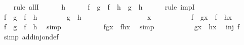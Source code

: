 \begin{isabellebody}
\ \ \isamarkupfalse%
\ {\isacharparenleft}rule\ allI{\isacharparenright}\isanewline
\ \ \ \ \isamarkupfalse%
\ h\isanewline
\ \ \ \ \isamarkupfalse%
\ {\isachardoublequoteopen}f\ {\isasymcirc}\ g\ {\isacharequal}\ f\ {\isasymcirc}\ h\ {\isasymlongrightarrow}\ {\isacharparenleft}g\ {\isacharequal}\ h{\isacharparenright}{\isachardoublequoteclose}\isanewline
\ \ \ \ \isamarkupfalse%
\ {\isacharparenleft}rule\ impI{\isacharparenright}\isanewline
\ \ \ \ \ \ \isamarkupfalse%
\ {\isachardoublequoteopen}f\ {\isasymcirc}\ g\ {\isacharequal}\ f\ {\isasymcirc}\ h{\isachardoublequoteclose}\isanewline
\ \ \ \ \ \ \isamarkupfalse%
\ {\isachardoublequoteopen}g\ {\isacharequal}\ h{\isachardoublequoteclose}\isanewline
\ \ \ \ \ \ \isamarkupfalse%
\ \isanewline
\ \ \ \ \ \ \ \ \isamarkupfalse%
\ x\isanewline
\ \ \ \ \ \ \ \ \isamarkupfalse%
\ \ {\isachardoublequoteopen}{\isacharparenleft}f\ {\isasymcirc}\ g{\isacharparenright}{\isacharparenleft}x{\isacharparenright}\ {\isacharequal}\ {\isacharparenleft}f\ {\isasymcirc}\ h{\isacharparenright}{\isacharparenleft}x{\isacharparenright}{\isachardoublequoteclose}\ \isamarkupfalse%
\ {\isacharbackquoteopen}f\ {\isasymcirc}\ g\ {\isacharequal}\ f\ {\isasymcirc}\ h{\isacharbackquoteclose}\ \isamarkupfalse%
\ simp\isanewline
\ \ \ \ \ \ \ \ \isamarkupfalse%
\ \isamarkupfalse%
\ {\isachardoublequoteopen}f{\isacharparenleft}g{\isacharparenleft}x{\isacharparenright}{\isacharparenright}\ {\isacharequal}\ f{\isacharparenleft}h{\isacharparenleft}x{\isacharparenright}{\isacharparenright}{\isachardoublequoteclose}\ \isamarkupfalse%
\ simp\isanewline
\ \ \ \ \ \ \ \ \isamarkupfalse%
\ \ {\isachardoublequoteopen}g{\isacharparenleft}x{\isacharparenright}\ {\isacharequal}\ h{\isacharparenleft}x{\isacharparenright}{\isachardoublequoteclose}\ \isamarkupfalse%
\ {\isacharbackquoteopen}inj\ f{\isacharbackquoteclose}\ \isamarkupfalse%
\ {\isacharparenleft}simp\ add{\isacharcolon}inj{\isacharunderscore}on{\isacharunderscore}def{\isacharparenright}\isanewline
\ \ \ \ \ \ \isamarkupfalse%
\isanewline
\ \ \ \ \isamarkupfalse%
\isanewline
\ \ \isamarkupfalse%
\isanewline
{}\isamarkupfalse%
\isanewline
%
\endisatagproof
{\isafoldproof}%
%
\isadelimproof
%
\endisadelimproof
\isanewline
{}\isamarkupfalse%

\end{isabellebody}
